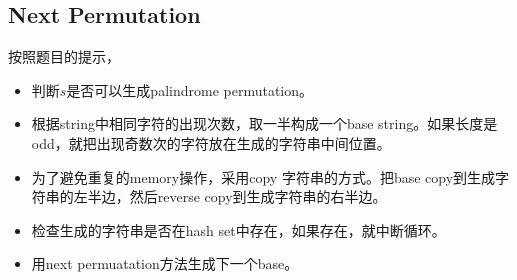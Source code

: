 \subsection{Next Permutation}
按照题目的提示，
\begin{itemize}
\item 判断$s$是否可以生成palindrome permutation。
\item 根据string中相同字符的出现次数，取一半构成一个base string。如果长度是odd，就把出现奇数次的字符放在生成的字符串中间位置。
\item 为了避免重复的memory操作，采用copy 字符串的方式。把base copy到生成字符串的左半边，然后reverse copy到生成字符串的右半边。
\item 检查生成的字符串是否在hash set中存在，如果存在，就中断循环。
\item 用next permuatation方法生成下一个base。
\end{itemize}
\setcounter{lstlisting}{0}
